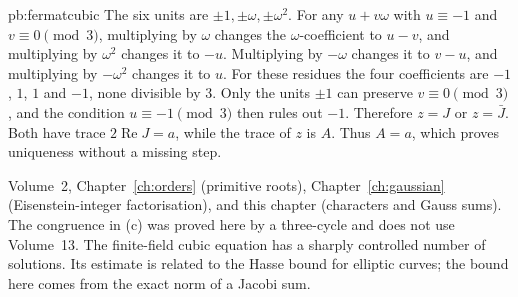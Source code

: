 \begin{solution}{pb:fermatcubic}
The six units are $\pm1,\pm\omega,\pm\omega^2$.
For any $u+v\omega$ with $u\equiv-1$ and
$v\equiv0\pmod3$, multiplying by $\omega$
changes the $\omega$-coefficient to $u-v$,
and multiplying by $\omega^2$ changes it to $-u$.
Multiplying by $-\omega$ changes it to $v-u$, and
multiplying by $-\omega^2$ changes it to $u$.
For these residues the four coefficients are
$-1$, $1$, $1$ and $-1$, none divisible by $3$.
Only the units $\pm1$ can preserve $v\equiv0\pmod3$,
and the condition $u\equiv-1\pmod3$ then rules out $-1$.
Therefore $z=J$ or $z=\bar J$.
Both have trace $2\operatorname{Re}J=a$,
while the trace of $z$ is $A$. Thus $A=a$,
which proves uniqueness without a missing step.


\tools Volume~2, Chapter~\ref{ch:orders} (primitive roots),
Chapter~\ref{ch:gaussian} (Eisenstein-integer factorisation), and this
chapter (characters and Gauss sums). The congruence in (c) was
proved here by a three-cycle and does not use Volume~13.
\leads The finite-field cubic equation has a sharply controlled number of solutions. Its estimate is related to the Hasse bound for elliptic curves; the bound here comes from the exact norm of a Jacobi sum.
\end{solution}

